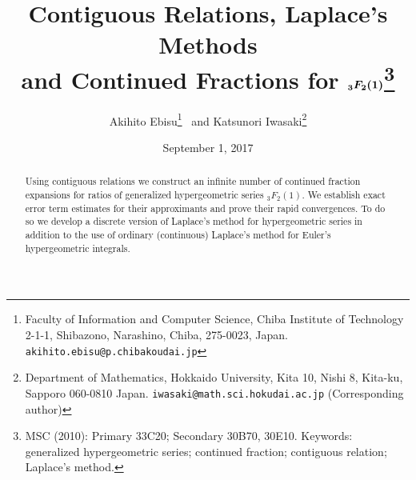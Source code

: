 \documentclass[a4paper,12pt]{article}
\title{\bf Contiguous Relations, Laplace's Methods \\ and  
Continued Fractions for $\mbox{\boldmath ${}_3F_2(1)$}$\thanks{MSC (2010): 
Primary 33C20; Secondary 30B70, 30E10. Keywords: generalized hypergeometric series; 
continued fraction; contiguous relation; Laplace's method.}}
\author{Akihito Ebisu\thanks{Faculty of Information and Computer Science, 
Chiba Institute of Technology 2-1-1, Shibazono, Narashino, Chiba, 275-0023, Japan. 
{\tt akihito.ebisu@p.chibakoudai.jp}} \ and Katsunori Iwasaki\thanks{Department of 
Mathematics, Hokkaido University, Kita 10, Nishi 8, Kita-ku, Sapporo 060-0810 Japan.  
{\tt iwasaki@math.sci.hokudai.ac.jp} (Corresponding author)}}
\date{September 1, 2017}
\theoremstyle{plain}
\begin{document}
\maketitle
\begin{abstract}
Using contiguous relations we construct an infinite number of   
continued fraction expansions for ratios of generalized 
hypergeometric series ${}_3F_2(1)$. 
We establish exact error term estimates for their approximants 
and prove their rapid convergences.    
To do so we develop a discrete version of Laplace's method for hypergeometric 
series in addition to the use of ordinary (continuous) Laplace's method for 
Euler's hypergeometric integrals.  
\end{abstract} 
\end{document}
